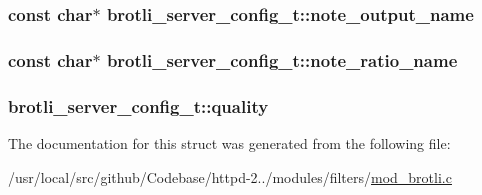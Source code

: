 \subsubsection[{\texorpdfstring{note\+\_\+output\+\_\+name}{note_output_name}}]{\setlength{\rightskip}{0pt plus 5cm}const char$\ast$ brotli\+\_\+server\+\_\+config\+\_\+t\+::note\+\_\+output\+\_\+name}\hypertarget{structbrotli__server__config__t_adbc5a20eb7a9ad4bfb1839f54af580c2}{}\label{structbrotli__server__config__t_adbc5a20eb7a9ad4bfb1839f54af580c2}
\subsubsection[{\texorpdfstring{note\+\_\+ratio\+\_\+name}{note_ratio_name}}]{\setlength{\rightskip}{0pt plus 5cm}const char$\ast$ brotli\+\_\+server\+\_\+config\+\_\+t\+::note\+\_\+ratio\+\_\+name}\hypertarget{structbrotli__server__config__t_aba2454e3dc686c50c3dbd53ba3a1a9b8}{}\label{structbrotli__server__config__t_aba2454e3dc686c50c3dbd53ba3a1a9b8}
\subsubsection[{\texorpdfstring{quality}{quality}}]{ brotli\+\_\+server\+\_\+config\+\_\+t\+::quality}\hypertarget{structbrotli__server__config__t_ad2625c3e4ab5eb771ae76fa428a9d772}{}\label{structbrotli__server__config__t_ad2625c3e4ab5eb771ae76fa428a9d772}


The documentation for this struct was generated from the following file\+:\begin{DoxyCompactItemize}
\item 
/usr/local/src/github/\+Codebase/httpd-\/2../modules/filters/\hyperlink{mod__brotli_8c}{mod\+\_\+brotli.\+c}\end{DoxyCompactItemize}
